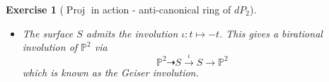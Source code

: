 \documentclass[a4paper,11pt]{amsart}
\newtheorem{exercise}[theorem]{Exercise}
\def\Proj{\operatorname{Proj}}
\newcommand{\CC}{\mathbb{C}}
\newcommand{\PP}{\mathbb{P}}
\renewcommand{\FF}{\mathbb{F}}
\newcommand{\defeq}{\vcentcolon=}
\newcommand{\rmap}{\dashrightarrow}
\begin{document}
\begin{exercise}[{$\Proj$ in action - anti-canonical ring of $dP_2$}]
\begin{itemize}
		In that case $\Proj(R(X,D))$ is isomorphic to the image of $X$ under the morphism given by a large multiple of $D$.
		\item The surface $S$ admits the involution $\iota\colon t \mapsto -t$.
		This gives a birational involution of $\PP^2$ via
		\[
		\PP^2 \rmap S \overset{\iota}{\longrightarrow} S \longrightarrow \PP^2
		\]
		which is known as the \emph{Geiser involution}.
	\end{itemize} 
\end{exercise}

\begin{comment}
\begin{exercise}[{Noether-Castelnuovo theorem}]\label{exer:NoetherCastelnuovo}
	Using the notation of \hyperlink{hirzGIT}{GIT quotient} for Hirzebruch surfaces consider the projective geometric quotient $T \defeq U // G$, where $U = \CC^5 \setminus \big(\{x_0=u_1=0\}\cup \{x_0=x_1=0\}\cup \{u_0=u_1=0\}\big)$ and $G = (\CC^*)^3$ acting via the weight matrix
		\[
		\begin{array}{c}	
			\hspace{.3cm}
			\begin{array}{ccccc}
				v & x_0 & x_1 & u_0 & u_1 
			\end{array}\\
			\left(
			\begin{array}{rrrrr}
				0 & 1 & 1 & \hspace{.2cm}0 & \hspace{.2cm}0\\
				0 &0 & -n & 1 & 1\\
			   -1 &1 &  0 & 0 & 1
			\end{array}	
			\right)
		\end{array}
		\]
		Denote by $e = \{v = 0\}$ and $\tilde{f} = \{u_1 = 0\}$.
		\begin{enumerate}
			\item Show that $e$ and $\tilde{f}$ are $(-1)$-curves.
			\item Show that the morphisms
			\[
			\begin{array}{ccccc}
				\FF_n & \leftarrow & T & \to & \FF_{n-1}\\
				(vx_0,x_1,u_0,vu_1) & \mapsfrom & (v,x_0,x_1,u_0,u_1) & \mapsto & (x_0,u_1x_1,u_0,vu_1)
			\end{array}
			\]
			are well defined and contract $e$ and $\tilde{f}$ respectively.
			Show that they are both inverses of blowups and the induced map $\FF_n \rmap \FF_{n-1}$ is the standard elementary transformation.
			Deduce that the standard elementary transformation is an elementary transformation in the sense of Definition \ref{def:SarkisovLink}.
		\end{enumerate}
\end{exercise}
\end{comment}



{}
  
\end{document}
